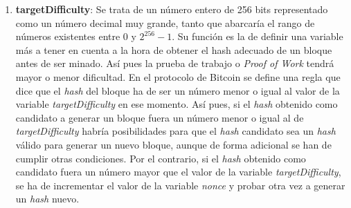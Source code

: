 \documentclass{article}
\begin{document}
\begin{enumerate}
\begin{verbatim}
    printf("Year: ");
    scanf("%d", &year);
    printf("Month: ");
    scanf("%d", &month);
    printf("Day: ");
    scanf("%d", &day);
    printf("Hour: ");
    scanf("%d", &hour);
    printf("Minute: ");
    scanf("%d", &minute);
    printf("Second: ");
    scanf("%d", &second);
    
    t.tm_year = year - 1900;
    t.tm_mon = month - 1;   // Values [0-11]
    t.tm_mday = day;
    t.tm_hour = hour + 1;   // GMT+1
    t.tm_min = minute;
    t.tm_sec = second;
    t.tm_isdst = 0;         // DST = 0
    tod = mktime(&t);
    
    printf("Timestamp epoch: %ld\n", (long) tod);
}
        \end{verbatim}
        
    
        \item \textbf{targetDifficulty}: Se trata de un número entero de 256 bits representado como un número decimal muy grande, tanto que abarcaría el rango de números existentes entre $0$ y $2^{256}-1$. Su función es la de definir una variable más a tener en cuenta a la hora de obtener el hash adecuado de un bloque antes de ser minado. Así pues la prueba de trabajo o \textit{Proof of Work} tendrá mayor o menor dificultad. En el protocolo de Bitcoin se define una regla que dice que el \textit{hash} del bloque ha de ser un número menor o igual al valor de la variable \textit{targetDifficulty} en ese momento. Así pues, si el \textit{hash} obtenido como candidato a generar un bloque fuera un número menor o igual al de \textit{targetDifficulty} habría posibilidades para que el \textit{hash} candidato sea un \textit{hash} válido para generar un nuevo bloque, aunque de forma adicional se han de cumplir otras condiciones. Por el contrario, si el \textit{hash} obtenido como candidato fuera un número mayor que el valor de la variable \textit{targetDifficulty}, se ha de incrementar el valor de la variable \textit{nonce} y probar otra vez a generar un \textit{hash} nuevo.
        

\end{enumerate}
\end{document}
